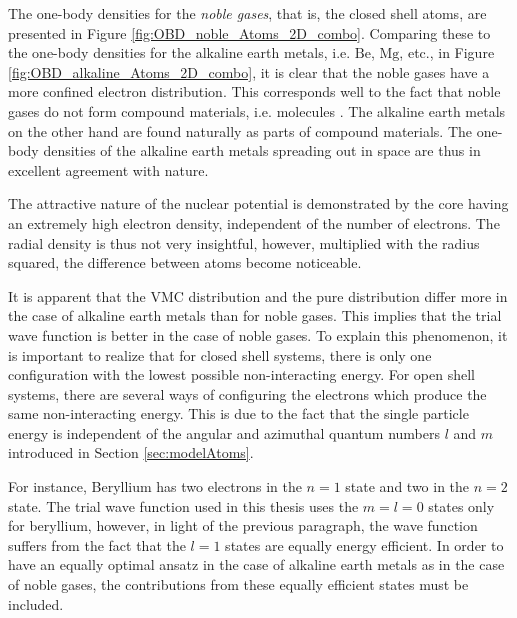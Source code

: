  The one-body densities for the \textit{noble gases}, that is, the closed shell atoms, are presented in Figure \ref{fig:OBD_noble_Atoms_2D_combo}. Comparing these to the one-body densities for the alkaline earth metals, i.e. $\mathrm{Be}$, $\mathrm{Mg}$, etc., in Figure \ref{fig:OBD_alkaline_Atoms_2D_combo}, it is clear that the noble gases have a more confined electron distribution. This corresponds well to the fact that noble gases do not form compound materials, i.e. molecules \cite{UniversityPhysics}. The alkaline earth metals on the other hand are found naturally as parts of compound materials. The one-body densities of the alkaline earth metals spreading out in space are thus in excellent agreement with nature.
 
 The attractive nature of the nuclear potential is demonstrated by the core having an extremely high electron density, independent of the number of electrons. The radial density is thus not very insightful, however, multiplied with the radius squared, the difference between atoms become noticeable.
 
It is apparent that the VMC distribution and the pure distribution differ more in the case of alkaline earth metals than for noble gases. This implies that the trial wave function is better in the case of noble gases. To explain this phenomenon, it is important to realize that for closed shell systems, there is only one configuration with the lowest possible non-interacting energy. For open shell systems, there are several ways of configuring the electrons which produce the same non-interacting energy. This is due to the fact that the single particle energy is independent of the angular and azimuthal quantum numbers $l$ and $m$ introduced in Section \ref{sec:modelAtoms}.

For instance, Beryllium has two electrons in the $n=1$ state and two in the $n=2$ state. The trial wave function used in this thesis uses the $m=l=0$ states only for beryllium, however, in light of the previous paragraph, the wave function suffers from the fact that the $l=1$ states are equally energy efficient. In order to have an equally optimal ansatz in the case of alkaline earth metals as in the case of noble gases, the contributions from these equally efficient states must be included. 
 
 
 
